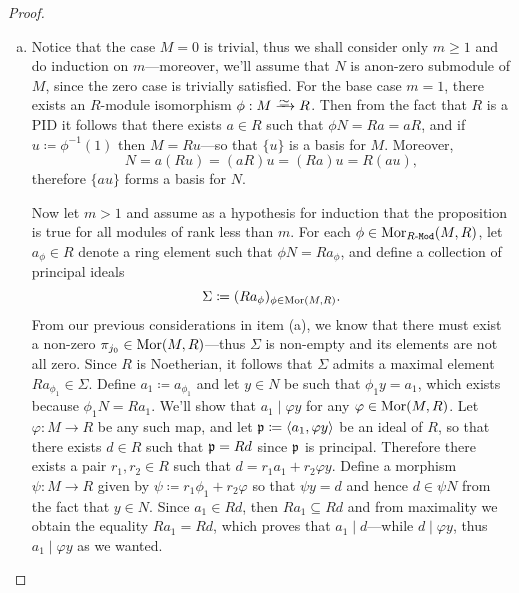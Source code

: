 \begin{proof}
\begin{enumerate}[(a)]
        \item Notice that the case \(M = 0\) is trivial, thus we shall consider only
              \(m \geq 1\) and do induction on \(m\)---moreover, we'll assume that \(N\) is
              anon-zero submodule of \(M\), since the zero case is trivially satisfied. For
              the base case \(m = 1\), there exists an \(R\)-module isomorphism
              \(\phi: M \isoto R\). Then from the fact that \(R\) is a PID it follows that
              there exists \(a \in R\) such that \(\phi N = R a = a R\), and if
              \(u \coloneq \phi^{-1}(1)\) then \(M = R u\)---so that \(\{u\}\) is a basis
              for \(M\). Moreover,
              \[
                  N = a (R u) = (a R) u = (R a) u = R (a u),
              \]
              therefore \(\{a u\}\) forms a basis for \(N\).

              Now let \(m > 1\) and assume as a hypothesis for induction that the
              proposition is true for all modules of rank less than \(m\). For each
              \(\phi \in \operatorname{Mor}_{{R\text{-}\texttt{Mod}}}(M, R)\), let \(a_{\phi} \in R\) denote a ring element
              such that \(\phi N = R a_{\phi}\), and define a collection of principal ideals
              \[
                  \Sigma \coloneq (R a_{\phi})_{\phi \in \operatorname{Mor}(M, R)}.
              \]
              From our previous considerations in item (a), we know that there must exist a
              non-zero \(\pi_{j_0} \in \operatorname{Mor}(M, R)\)---thus \(\Sigma\) is non-empty and its
              elements are not all zero. Since \(R\) is Noetherian, it follows that
              \(\Sigma\) admits a maximal element \(R a_{\phi_1} \in \Sigma\). Define
              \(a_1 \coloneq a_{\phi_1}\) and let \(y \in N\) be such that
              \(\phi_1 y = a_1\), which exists because \(\phi_1 N = R a_1\). We'll show that
              \(a_1 \mid \varphi y\) for any \(\varphi \in \operatorname{Mor}(M, R)\). Let
              \(\varphi: M \to R\) be any such map, and let
              \(\mathfrak{p} \coloneq \langle a_1, \varphi y \rangle\) be an ideal of \(R\), so
              that there exists \(d \in R\) such that \(\mathfrak{p} = R d\) since \(\mathfrak{p}\)
              is principal. Therefore there exists a pair \(r_1, r_2 \in R\) such that
              \(d = r_1 a_1 + r_2 \varphi y\). Define a morphism \(\psi: M \to R\) given by
              \(\psi \coloneq r_1 \phi_1 + r_2 \varphi\) so that \(\psi y = d\) and hence
              \(d \in \psi N\) from the fact that \(y \in N\). Since \(a_1 \in R d\), then
              \(R a_1 \subseteq R d\) and from maximality we obtain the equality
              \(R a_1 = R d\), which proves that \(a_1 \mid d\)---while
              \(d \mid \varphi y\), thus \(a_1 \mid \varphi y\) as we wanted.


\end{enumerate}
\end{proof}
